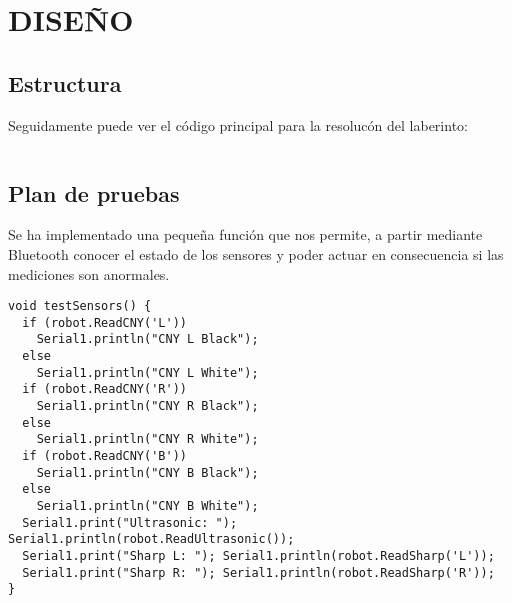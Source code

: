 
\chapter{DISEÑO}

\section{Estructura}

Seguidamente puede ver el código principal para la resolucón del laberinto:

\inputminted{arduino}{code/main.ino}

\vspace{-15pt}
\section{Plan de pruebas}
Se ha implementado una pequeña función que nos permite, a partir mediante Bluetooth conocer el estado de los sensores y poder actuar en consecuencia si las mediciones son anormales.

\begin{verbatim}
void testSensors() {
  if (robot.ReadCNY('L'))
    Serial1.println("CNY L Black");
  else
    Serial1.println("CNY L White");
  if (robot.ReadCNY('R'))
    Serial1.println("CNY R Black");
  else
    Serial1.println("CNY R White");
  if (robot.ReadCNY('B'))
    Serial1.println("CNY B Black");
  else
    Serial1.println("CNY B White");
  Serial1.print("Ultrasonic: "); Serial1.println(robot.ReadUltrasonic());
  Serial1.print("Sharp L: "); Serial1.println(robot.ReadSharp('L'));
  Serial1.print("Sharp R: "); Serial1.println(robot.ReadSharp('R'));
}
\end{verbatim}
